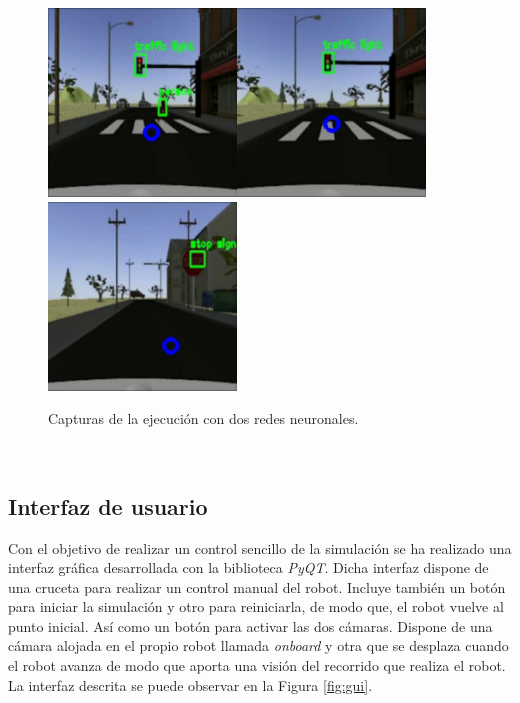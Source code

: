 \begin{figure} [h!]
	\begin{center}
		\includegraphics[width=5cm]{figs/simRed}\hspace{0.1cm}\includegraphics[width=5cm]{figs/simGreen}\hspace{0.1cm}\includegraphics[width=5cm]{figs/simStop}
	\end{center}
	\caption{Capturas de la ejecución con dos redes neuronales.}
	\label{fig:simexecution}
\end{figure}\

\subsection{Interfaz de usuario}
\label{subsection:interface}
Con el objetivo de realizar un control sencillo de la simulación se ha realizado una interfaz gráfica desarrollada con la biblioteca \textit{PyQT}. Dicha interfaz dispone de una cruceta para realizar un control manual del robot. Incluye también un botón para iniciar la simulación y otro para reiniciarla, de modo que, el robot vuelve al punto inicial. Así como un botón para activar las dos cámaras. Dispone de una cámara alojada en el propio robot llamada \textit{onboard} y otra que se desplaza cuando el robot avanza de modo que aporta una visión del recorrido que realiza el robot. La interfaz descrita se puede observar en la Figura \ref{fig:gui}.\\

